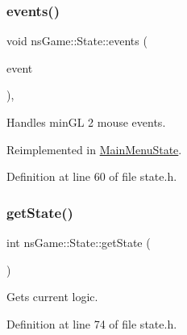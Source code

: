 \mbox{\label{structns_game_1_1_state_a2e1daaca20e580bdb4baf8215e1b51c9}} 
\subsubsection{\texorpdfstring{events()}{events()}}
{\footnotesize\ttfamily void ns\+Game\+::\+State\+::events (\begin{DoxyParamCaption}\item[{ns\+Event\+::\+Event\+\_\+t}]{event }\end{DoxyParamCaption})\hspace{0.3cm}{\ttfamily [inline]}, {\ttfamily [virtual]}}



Handles min\+GL 2 mouse events. 



Reimplemented in \hyperlink{class_main_menu_state_a6d740479d4dce733c069921478d70a37}{Main\+Menu\+State}.



Definition at line 60 of file state.\+h.

\mbox{\label{structns_game_1_1_state_abcc65369e15769b5c6ae588f61beeb02}} 
\subsubsection{\texorpdfstring{get\+State()}{getState()}}
{\footnotesize\ttfamily int ns\+Game\+::\+State\+::get\+State (\begin{DoxyParamCaption}{ }\end{DoxyParamCaption})\hspace{0.3cm}{\ttfamily [inline]}}



Gets current logic. 



Definition at line 74 of file state.\+h.

\mbox{\label{structns_game_1_1_state_a8644de505f7a84933f6d6e6651205791}} 
